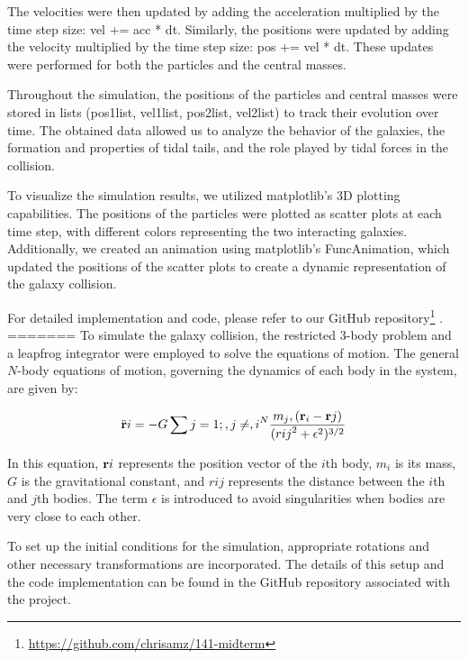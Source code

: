 \documentclass[reprint, amsmath, amssymb, aps]{revtex4-2}
\begin{document}
The velocities were then updated by adding the acceleration multiplied by the time step size: vel += acc * dt. Similarly, the positions were updated by adding the velocity multiplied by the time step size: pos += vel * dt. These updates were performed for both the particles and the central masses.

Throughout the simulation, the positions of the particles and central masses were stored in lists (pos1\textunderscore list, vel1\textunderscore list, pos2\textunderscore list, vel2\textunderscore list) to track their evolution over time. The obtained data allowed us to analyze the behavior of the galaxies, the formation and properties of tidal tails, and the role played by tidal forces in the collision.

To visualize the simulation results, we utilized matplotlib's 3D plotting capabilities. The positions of the particles were plotted as scatter plots at each time step, with different colors representing the two interacting galaxies. Additionally, we created an animation using matplotlib's FuncAnimation, which updated the positions of the scatter plots to create a dynamic representation of the galaxy collision.

For detailed implementation and code, please refer to our GitHub repository\footnote{\url{https://github.com/chrisamz/141-midterm}} \cite{github}.
=======
To simulate the galaxy collision, the restricted 3-body problem and a leapfrog integrator were employed to solve the equations of motion. The general $N$-body equations of motion, governing the dynamics of each body in the system, are given by:

\begin{equation}
    \ddot{{\bf r}}i = -G \sum{j=1;, j \not = ,i}^N \frac{{m_j , ({\bf r}_i - {\bf r}j)}}{{(r{ij}^2 + \epsilon^2)^{3/2}}}
    \label{eq:general_motion}
\end{equation}

In this equation, ${\bf r}i$ represents the position vector of the $i$th body, $m_i$ is its mass, $G$ is the gravitational constant, and $r{ij}$ represents the distance between the $i$th and $j$th bodies. The term $\epsilon$ is introduced to avoid singularities when bodies are very close to each other.

To set up the initial conditions for the simulation, appropriate rotations and other necessary transformations are incorporated. The details of this setup and the code implementation can be found in the GitHub repository associated with the project\cite{github}.
\end{document}
